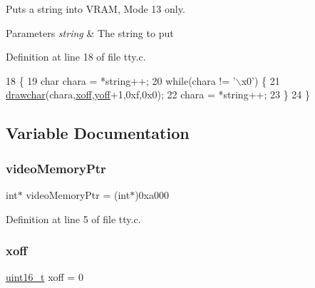 Puts a string into V\+R\+AM, Mode 13 only. 


\begin{DoxyParams}{Parameters}
{\em string} & The string to put \\
\hline
\end{DoxyParams}


Definition at line 18 of file tty.\+c.


\begin{DoxyCode}
18                                     \{
19     \textcolor{keywordtype}{char} chara = *\textcolor{keywordtype}{string}++;
20     \textcolor{keywordflow}{while}(chara != \textcolor{stringliteral}{'\(\backslash\)x0'}) \{
21         \hyperlink{a00008_a2c8df7a20b47341b70d97a7ff21d86ea_a2c8df7a20b47341b70d97a7ff21d86ea}{drawchar}(chara,\hyperlink{a00041_abaa0d20f0e52ce0d3a7d706f6ac16266_abaa0d20f0e52ce0d3a7d706f6ac16266}{xoff},\hyperlink{a00041_a1a7539764d0ae8cd06ce45c62cf92bca_a1a7539764d0ae8cd06ce45c62cf92bca}{yoff}+1,0xf,0x0);
22         chara = *\textcolor{keywordtype}{string}++;
23     \}
24 \}
\end{DoxyCode}


\subsection{Variable Documentation}
\mbox{\label{a00041_a3f896e9c00b9302e2287aad054199134_a3f896e9c00b9302e2287aad054199134}} 
\subsubsection{\texorpdfstring{video\+Memory\+Ptr}{videoMemoryPtr}}
{\footnotesize\ttfamily int$\ast$ video\+Memory\+Ptr = (int$\ast$)0xa000}



Definition at line 5 of file tty.\+c.

\mbox{\label{a00041_abaa0d20f0e52ce0d3a7d706f6ac16266_abaa0d20f0e52ce0d3a7d706f6ac16266}} 
\subsubsection{\texorpdfstring{xoff}{xoff}}
{\footnotesize\ttfamily \hyperlink{a00035_a273cf69d639a59973b6019625df33e30_a273cf69d639a59973b6019625df33e30}{uint16\+\_\+t} xoff = 0}



